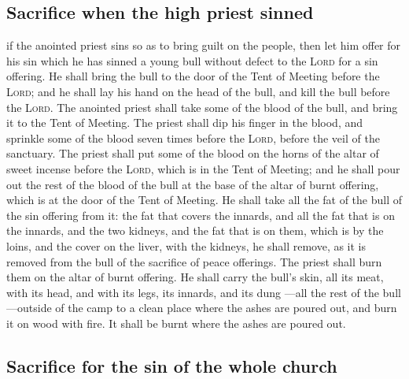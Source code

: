 \hypertarget{sacrifice-when-the-high-priest-sinned}{%
\subsection{Sacrifice when the high priest
sinned}\label{sacrifice-when-the-high-priest-sinned}}

 if the anointed priest sins so as to bring guilt on the
people, then let him offer for his sin which he has sinned a young bull
without defect to the \textsc{Lord} for a sin offering. 
He shall bring the bull to the door of the Tent of Meeting before the
\textsc{Lord}; and he shall lay his hand on the head of the bull, and
kill the bull before the \textsc{Lord}.  The anointed
priest shall take some of the blood of the bull, and bring it to the
Tent of Meeting.  The priest shall dip his finger in the
blood, and sprinkle some of the blood seven times before the
\textsc{Lord}, before the veil of the sanctuary.  The
priest shall put some of the blood on the horns of the altar of sweet
incense before the \textsc{Lord}, which is in the Tent of Meeting; and
he shall pour out the rest of the blood of the bull at the base of the
altar of burnt offering, which is at the door of the Tent of Meeting.
 He shall take all the fat of the bull of the sin offering
from it: the fat that covers the innards, and all the fat that is on the
innards,  and the two kidneys, and the fat that is on
them, which is by the loins, and the cover on the liver, with the
kidneys, he shall remove,  as it is removed from the bull
of the sacrifice of peace offerings. The priest shall burn them on the
altar of burnt offering.  He shall carry the bull's skin,
all its meat, with its head, and with its legs, its innards, and its
dung  ---all the rest of the bull---outside of the camp
to a clean place where the ashes are poured out, and burn it on wood
with fire. It shall be burnt where the ashes are poured out.

\hypertarget{sacrifice-for-the-sin-of-the-whole-church}{%
\subsection{Sacrifice for the sin of the whole
church}\label{sacrifice-for-the-sin-of-the-whole-church}}

